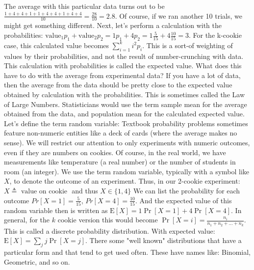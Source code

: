 \documentclass[main.tex]{subfiles}
\begin{document}
The average with this particular data turns out to be $\frac{1+4+4+1+1+4+4+1+4+4}{10}=\frac{28}{10}=2.8$. Of course, if we ran another 10 trials, we might get something different. Next, let's perform a calculation with the probabilities:
$\text {value}_{1} p_{1}+\text {value}_{2} p_{2}=1 p_{1}+4 p_{2}=1 \frac{5}{15}+4 \frac{10}{15}=3$. For the k-cookie case, this calculated value becomes $\sum_{i=1}^{k} i^{2} p_{i}$. This is a sort-of weighting of values by their probabilities, and not the result of number-crunching with data. This calculation with probabilities is called the expected value. What does this have to do with the average from experimental data? If you have a lot of data, then the average from the data should be pretty close to the expected value obtained by calculation with the probabilities. This is sometimes called the Law of Large Numbers. Statisticians would use the term sample mean for the average obtained from the data, and population mean for the calculated expected value.\\

Let's define the term random variable: Textbook probability problems sometimes feature non-numeric entities like a deck of cards (where the average makes no sense). We will restrict our attention to only experiments with numeric outcomes, even if they are numbers on cookies. Of course, in the real world, we have measurements like temperature (a real number) or the number of students in room (an integer). We use the term random variable, typically with a symbol like $X$, to denote the outcome of an experiment. Thus, in our 2-cookie experiment: $X \triangleq \text { value on cookie }$ and thus $X \in\{1,4\}$ We can list the probability for each outcome ${Pr}[X=1]=\frac{5}{15}$, ${Pr}[X=4]=\frac{10}{15}$. And the expected value of this random variable then is written as $\mathrm{E}[X]=1 \operatorname{Pr}[X=1]+4 \operatorname{Pr}[X=4]$. In general, for the $k$ cookie version this would become $\operatorname{Pr}[X=i]=\frac{n_{i}}{n_{1}+n_{2}+\ldots+n_{k}}$. This is called a discrete probability distribution. With expected value: $\mathrm{E}[X]=\sum_{j} j \operatorname{Pr}[X=j]$. There some "well known" distributions that have a particular form and that tend to get used often. These have names like: Binomial, Geometric, and so on.\\
\end{document}
